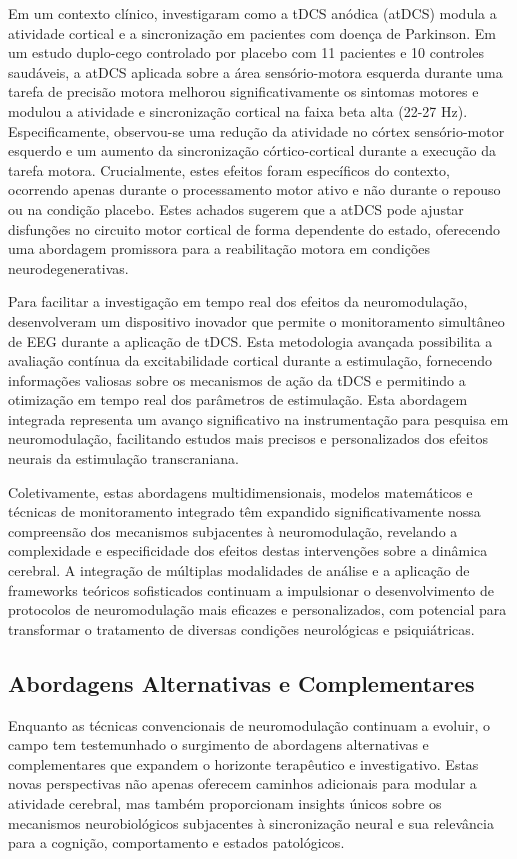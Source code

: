Em um contexto clínico,  investigaram como a tDCS anódica (atDCS) modula a atividade cortical e a sincronização em pacientes com doença de Parkinson. Em um estudo duplo-cego controlado por placebo com 11 pacientes e 10 controles saudáveis, a atDCS aplicada sobre a área sensório-motora esquerda durante uma tarefa de precisão motora melhorou significativamente os sintomas motores e modulou a atividade e sincronização cortical na faixa beta alta (22-27 Hz). Especificamente, observou-se uma redução da atividade no córtex sensório-motor esquerdo e um aumento da sincronização córtico-cortical durante a execução da tarefa motora. Crucialmente, estes efeitos foram específicos do contexto, ocorrendo apenas durante o processamento motor ativo e não durante o repouso ou na condição placebo. Estes achados sugerem que a atDCS pode ajustar disfunções no circuito motor cortical de forma dependente do estado, oferecendo uma abordagem promissora para a reabilitação motora em condições neurodegenerativas.

Para facilitar a investigação em tempo real dos efeitos da neuromodulação,  desenvolveram um dispositivo inovador que permite o monitoramento simultâneo de EEG durante a aplicação de tDCS. Esta metodologia avançada possibilita a avaliação contínua da excitabilidade cortical durante a estimulação, fornecendo informações valiosas sobre os mecanismos de ação da tDCS e permitindo a otimização em tempo real dos parâmetros de estimulação. Esta abordagem integrada representa um avanço significativo na instrumentação para pesquisa em neuromodulação, facilitando estudos mais precisos e personalizados dos efeitos neurais da estimulação transcraniana.

Coletivamente, estas abordagens multidimensionais, modelos matemáticos e técnicas de monitoramento integrado têm expandido significativamente nossa compreensão dos mecanismos subjacentes à neuromodulação, revelando a complexidade e especificidade dos efeitos destas intervenções sobre a dinâmica cerebral. A integração de múltiplas modalidades de análise e a aplicação de frameworks teóricos sofisticados continuam a impulsionar o desenvolvimento de protocolos de neuromodulação mais eficazes e personalizados, com potencial para transformar o tratamento de diversas condições neurológicas e psiquiátricas.

\subsection{Abordagens Alternativas e Complementares}
Enquanto as técnicas convencionais de neuromodulação continuam a evoluir, o campo tem testemunhado o surgimento de abordagens alternativas e complementares que expandem o horizonte terapêutico e investigativo. Estas novas perspectivas não apenas oferecem caminhos adicionais para modular a atividade cerebral, mas também proporcionam insights únicos sobre os mecanismos neurobiológicos subjacentes à sincronização neural e sua relevância para a cognição, comportamento e estados patológicos.

